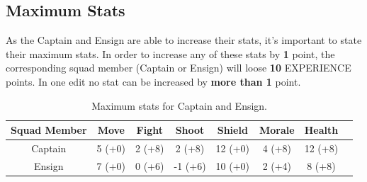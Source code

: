 \documentclass[12pt,a4paper]{article}
\begin{document}
\newpage

\subsection{Maximum Stats}

As the Captain and Ensign are able to increase their stats, it's important to state their maximum stats. In order to increase any of these stats by \textbf{1} point, the corresponding squad member (Captain or Ensign) will loose \textbf{10} EXPERIENCE points. In one edit no stat can be increased by \textbf{more than 1} point.

\begin{table}[!ht]
\begin{center}
\begin{tabular}{|c|c|c|c|c|c|c|c|}
\hline
{\bf Squad Member} & {\bf Move} & {\bf Fight} & {\bf Shoot} & {\bf Shield} & {\bf Morale} & {\bf Health}\\
\hline
  Captain & 5 (+0) & 2 (+8) & 2 (+8) & 12 (+0) & 4 (+8) & 12 (+8)\\
  \hline
  Ensign & 7 (+0) & 0 (+6) & -1 (+6) & 10 (+0) & 2 (+4) & 8 (+8)\\
\hline
\end{tabular}
\end{center}
\caption{Maximum stats for Captain and Ensign.}
\label{simple_table}
\end{table}






\end{document}
